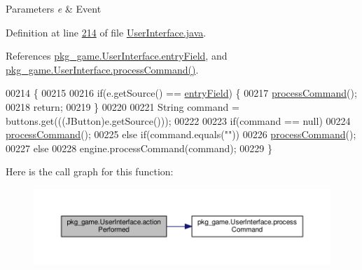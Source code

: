 \begin{DoxyParams}{Parameters}
{\em e} & Event \\
\hline
\end{DoxyParams}


Definition at line \hyperlink{UserInterface_8java_source_l00214}{214} of file \hyperlink{UserInterface_8java_source}{User\-Interface.\-java}.



References \hyperlink{UserInterface_8java_source_l00030}{pkg\-\_\-game.\-User\-Interface.\-entry\-Field}, and \hyperlink{UserInterface_8java_source_l00234}{pkg\-\_\-game.\-User\-Interface.\-process\-Command()}.


\begin{DoxyCode}
00214                                                \{
00215 
00216         \textcolor{keywordflow}{if}(e.getSource() == \hyperlink{classpkg__game_1_1UserInterface_ae405fc2ad81ccf31aad56484a9c1c2bc}{entryField}) \{
00217             \hyperlink{classpkg__game_1_1UserInterface_ae708d0c4af18579b5c9fc3b671fcc03f}{processCommand}();
00218             \textcolor{keywordflow}{return};
00219         \}
00220 
00221         String command = buttons.get(((JButton)e.getSource()));
00222 
00223         \textcolor{keywordflow}{if}(command == null)
00224             \hyperlink{classpkg__game_1_1UserInterface_ae708d0c4af18579b5c9fc3b671fcc03f}{processCommand}();
00225         \textcolor{keywordflow}{else} \textcolor{keywordflow}{if}(command.equals(\textcolor{stringliteral}{""}))
00226             \hyperlink{classpkg__game_1_1UserInterface_ae708d0c4af18579b5c9fc3b671fcc03f}{processCommand}();
00227         \textcolor{keywordflow}{else}
00228             engine.processCommand(command);
00229     \}
\end{DoxyCode}


Here is the call graph for this function\-:\nopagebreak
\begin{figure}[H]
\begin{center}
\leavevmode
\includegraphics[width=350pt]{classpkg__game_1_1UserInterface_a55cb092ba130a286917cbd6c064136b2_cgraph}
\end{center}
\end{figure}


